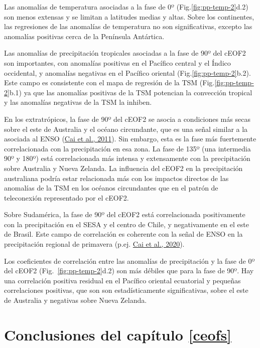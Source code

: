 \documentclass[12pt,oneside,a4paper]{reedthesis}
\begin{document}
Las anomalías de temperatura asociadas a la fase de 0º (Fig.\ref{fig:pp-temp-2}d.2) son menos extensas y se limitan a latitudes medias y altas.
Sobre los continentes, las regresiones de las anomalías de temperatura no son significativas, excepto las anomalías positivas cerca de la Península Antártica.

Las anomalías de precipitación tropicales asociadas a la fase de 90º del cEOF2 son importantes, con anomalías positivas en el Pacífico central y el Índico occidental, y anomalías negativas en el Pacífico oriental (Fig.\ref{fig:pp-temp-2}b.2).
Este campo es consistente con el mapa de regresión de la TSM (Fig.\ref{fig:pp-temp-2}b.1) ya que las anomalías positivas de la TSM potencian la convección tropical y las anomalías negativas de la TSM la inhiben.

En los extratrópicos, la fase de 90º del cEOF2 se asocia a condiciones más secas sobre el este de Australia y el océano circundante, que es una señal similar a la asociada al ENSO (\protect\hyperlink{ref-cai2011}{Cai et al., 2011}).
Sin embargo, esta es la fase más fuertemente correlacionada con la precipitación en esa zona.
La fase de 135º (una intermedia 90º y 180º) está correlacionada más intensa y extensamente con la precipitación sobre Australia y Nueva Zelanda.
La influencia del cEOF2 en la precipitación australiana podría estar relacionada más con los impactos directos de las anomalías de la TSM en los océanos circundantes que en el patrón de teleconexión representado por el cEOF2.

Sobre Sudamérica, la fase de 90º del cEOF2 está correlacionada positivamente con la precipitación en el SESA y el centro de Chile, y negativamente en el este de Brasil.
Este campo de correlación es coherente con la señal de ENSO en la precipitación regional de primavera (p.ej. \protect\hyperlink{ref-cai2020a}{Cai et al., 2020}).

Los coeficientes de correlación entre las anomalías de precipitación y la fase de 0º del cEOF2 (Fig.~\ref{fig:pp-temp-2}d.2) son más débiles que para la fase de 90º.
Hay una correlación positiva residual en el Pacífico oriental ecuatorial y pequeñas correlaciones positivas, que son son estadísticamente significativas, sobre el este de Australia y negativas sobre Nueva Zelanda.

\hypertarget{conclusiones-del-capuxedtulo-refceofs}{%
\section{Conclusiones del capítulo \ref{ceofs}}\label{conclusiones-del-capuxedtulo-refceofs}}
\end{document}
